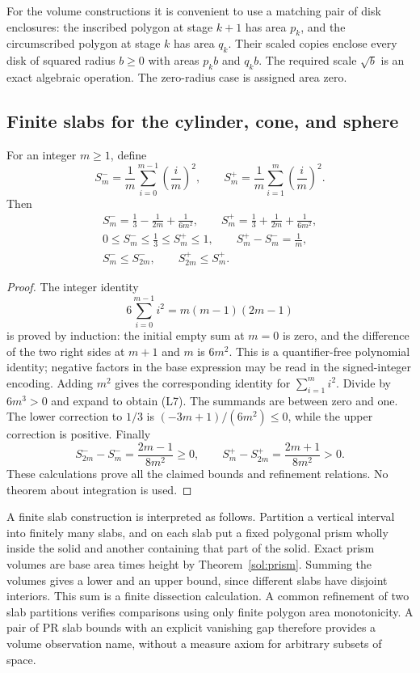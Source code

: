 For the volume constructions it is convenient to use a matching pair of
disk enclosures: the inscribed polygon at stage $k+1$ has area $p_k$,
and the circumscribed polygon at stage $k$ has area $q_k$.
Their scaled copies enclose every disk of squared radius $b\ge0$ with
areas $p_kb$ and $q_kb$. The required scale $\sqrt b$ is an exact
algebraic operation. The zero-radius case is assigned area zero.

\subsection{Finite slabs for the cylinder, cone, and sphere}

\begin{lemma}
\label{lim:sums}
For an integer $m\ge1$, define
\[
 S_m^-=\frac{1}{m}\sum_{i=0}^{m-1}\left(\frac{i}{m}\right)^2,
 \qquad
 S_m^+=\frac{1}{m}\sum_{i=1}^{m}\left(\frac{i}{m}\right)^2.
\]
Then
\begin{gather*}
 S_m^-=\frac{1}{3}-\frac{1}{2m}+\frac{1}{6m^2},\qquad
 S_m^+=\frac{1}{3}+\frac{1}{2m}+\frac{1}{6m^2},\\
 0\le S_m^-\le\tfrac13\le S_m^+\le1,\qquad
 S_m^+-S_m^-=\frac{1}{m},                             \tag{L7}\\
 S_m^-\le S_{2m}^-,\qquad S_{2m}^+\le S_m^+.
\end{gather*}
\end{lemma}
\begin{proof}
The integer identity
\[
 6\sum_{i=0}^{m-1}i^2=m(m-1)(2m-1)
\]
is proved by induction: the initial empty sum at $m=0$ is zero, and the
difference of the two right sides at $m+1$ and $m$ is $6m^2$.
This is a quantifier-free polynomial identity; negative factors in the
base expression may be read in the signed-integer encoding.
Adding $m^2$ gives the corresponding identity for $\sum_{i=1}^m i^2$.
Divide by $6m^3>0$ and expand to obtain (L7).
The summands are between zero and one. The lower correction to $1/3$
is $(-3m+1)/(6m^2)\le0$, while the upper correction is positive.
Finally
\[
 S_{2m}^--S_m^-=\frac{2m-1}{8m^2}\ge0,
 \qquad S_m^+-S_{2m}^+=\frac{2m+1}{8m^2}>0.
\]
These calculations prove all the claimed bounds and refinement relations.
No theorem about integration is used.
\end{proof}

A finite slab construction is interpreted as follows. Partition a
vertical interval into finitely many slabs, and on each slab put a fixed
polygonal prism wholly inside the solid and another containing that
part of the solid. Exact prism volumes are base area times height by
Theorem~\ref{sol:prism}. Summing the volumes gives a lower and an upper
bound, since different slabs have disjoint interiors. This sum is a
finite dissection calculation. A common refinement of two slab
partitions verifies comparisons using only finite polygon area
monotonicity. A pair of PR slab bounds with an explicit vanishing gap
therefore provides a volume observation name, without a measure axiom
for arbitrary subsets of space.

